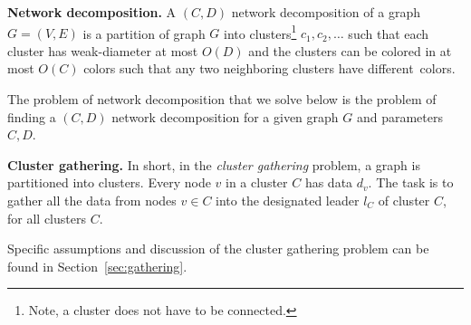 {\noindent\textbf{Network decomposition.} 
A $(C,D)$ network decomposition of a graph $G=(V,E)$ is a partition of graph $G$ into clusters\footnote{Note, a cluster does not have to be connected.} $c_1,c_2,\dots$ such that each cluster has weak-diameter at most $O(D)$ and the clusters can be colored in at most $O(C)$ colors such that any two neighboring clusters have different~colors.

The problem of network decomposition that we solve below is the problem of finding a $(C,D)$ network decomposition for a given graph $G$ and parameters $C,D$.

\noindent\textbf{Cluster gathering.}
In short, in the \emph{cluster gathering} problem, a graph is partitioned into clusters. 
Every node $v$ in a cluster $C$ has data $d_v$. The task is to gather all the data from nodes $v \in C$ into the designated leader $l_C$ of cluster $C$, for all clusters $C$.

Specific assumptions and discussion of the cluster gathering problem can be found in Section~\ref{sec:gathering}.



}

